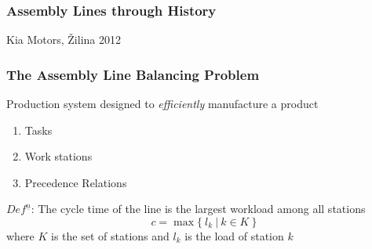 \documentclass{beamer}
\begin{document}
\begin{frame}
\frametitle{Assembly Lines through History}
\centering
Kia Motors, \v{Z}ilina 2012\\[2mm]

\end{frame}

\begin{frame}
\frametitle{The Assembly Line Balancing Problem}
Production system designed to \emph{efficiently} manufacture a product\vspace{3mm}\pause	
\begin{enumerate}
	\item Tasks \vspace{2mm}
	\item Work stations\vspace{2mm}
	\item Precedence Relations\pause
\end{enumerate}
\vspace{4mm}
$Def^{\underline{n}}$: The {\color{red} cycle time} of the line is
the largest workload among all stations
\[ c = \max\{\: l_k \: | \: k\in K\:\} \]
	where $K$ is the set of stations and $l_k$ is the load of station $k$
\end{frame}
\end{document}
